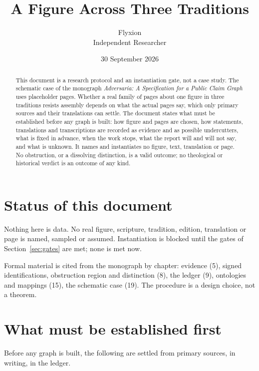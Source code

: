 \documentclass[11pt]{article}
\title{A Figure Across Three Traditions}
\author{Flyxion\\\small Independent Researcher}
\date{30 September 2026}
\begin{document}
\maketitle

\begin{abstract}
\noindent
This document is a research protocol and an instantiation gate, not a case study. The schematic case of the monograph \emph{Adversaria: A Specification for a Public Claim Graph} uses placeholder pages. Whether a real family of pages about one figure in three traditions resists assembly depends on what the actual pages say, which only primary sources and their translations can settle. The document states what must be established before any graph is built: how figure and pages are chosen, how statements, translations and transcriptions are recorded as evidence and as possible undercutters, what is fixed in advance, when the work stops, what the report will and will not say, and what is unknown. It names and instantiates no figure, text, translation or page. No obstruction, or a dissolving distinction, is a valid outcome; no theological or historical verdict is an outcome of any kind.
\end{abstract}

\section{Status of this document}

Nothing here is data. No real figure, scripture, tradition, edition, translation or page is named, sampled or assumed. Instantiation is blocked until the gates of Section~\ref{sec:gates} are met; none is met now.

Formal material is cited from the monograph by chapter: evidence (5), signed identifications, obstruction region and distinction (8), the ledger (9), ontologies and mappings (15), the schematic case (19). The procedure is a design choice, not a theorem.

\section{What must be established first}\label{sec:gate0}

Before any graph is built, the following are settled from primary sources, in writing, in the ledger.
\end{document}
